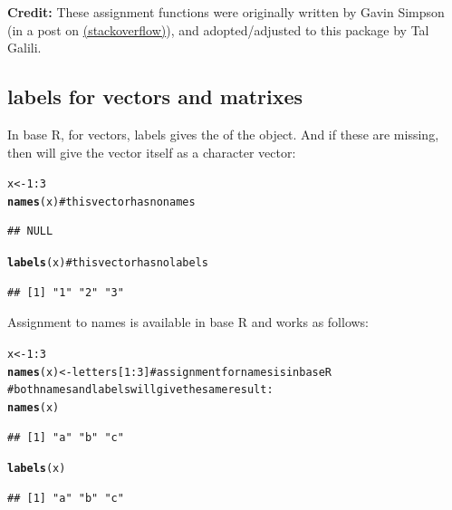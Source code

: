 \documentclass[shortnames,nojss,article]{jss}\usepackage{graphicx, color}
\makeatletter
\newcommand{\hlfunctioncall}[1]{\textcolor[rgb]{0.501960784313725,0,0.329411764705882}{\textbf{#1}}}%
\newcommand{\hlcomment}[1]{\textcolor[rgb]{0.180392156862745,0.6,0.341176470588235}{#1}}%
\newenvironment{kframe}{%
 \def\at@end@of@kframe{}%
 \ifinner\ifhmode%
  \def\at@end@of@kframe{\end{minipage}}%
  \begin{minipage}{\columnwidth}%
 \fi\fi%
 \def\FrameCommand##1{\hskip\@totalleftmargin \hskip-\fboxsep
 \colorbox{shadecolor}{##1}\hskip-\fboxsep
     \hskip-\linewidth \hskip-\@totalleftmargin \hskip\columnwidth}%
 \MakeFramed {\advance\hsize-\width
   \@totalleftmargin\z@ \linewidth\hsize
   \@setminipage}}%
 {\par\unskip\endMakeFramed%
 \at@end@of@kframe}
\newenvironment{knitrout}{}{} %
\makeatother
\begin{document}
\textbf{Credit:} These assignment functions were originally written by Gavin Simpson (in a post on \href{http://stackoverflow.com/questions/4614223/how-to-have-the-following-work-labelsx-some-value-r-question}{(stackoverflow)}), and adopted/adjusted to this package by Tal Galili.


\subsection{labels for vectors and matrixes}

In base R, for vectors, labels gives the  of the object. And if these are missing, then  will give the vector itself as a character vector:

\begin{knitrout}
\color{fgcolor}\begin{kframe}
\begin{alltt}
x <- 1:3
\hlfunctioncall{names}(x)  \hlcomment{# this vector has no names}
\end{alltt}
\begin{verbatim}
## NULL
\end{verbatim}
\begin{alltt}
\hlfunctioncall{labels}(x)  \hlcomment{# this vector has no labels}
\end{alltt}
\begin{verbatim}
## [1] "1" "2" "3"
\end{verbatim}
\end{kframe}
\end{knitrout}


Assignment to names is available in base R and works as follows:

\begin{knitrout}
\color{fgcolor}\begin{kframe}
\begin{alltt}
x <- 1:3
\hlfunctioncall{names}(x) <- letters[1:3]  \hlcomment{# assignment for names is in base R}
\hlcomment{# both names and labels will give the same result:}
\hlfunctioncall{names}(x)
\end{alltt}
\begin{verbatim}
## [1] "a" "b" "c"
\end{verbatim}
\begin{alltt}
\hlfunctioncall{labels}(x)
\end{alltt}
\begin{verbatim}
## [1] "a" "b" "c"
\end{verbatim}
\end{kframe}
\end{knitrout}
\end{document}
